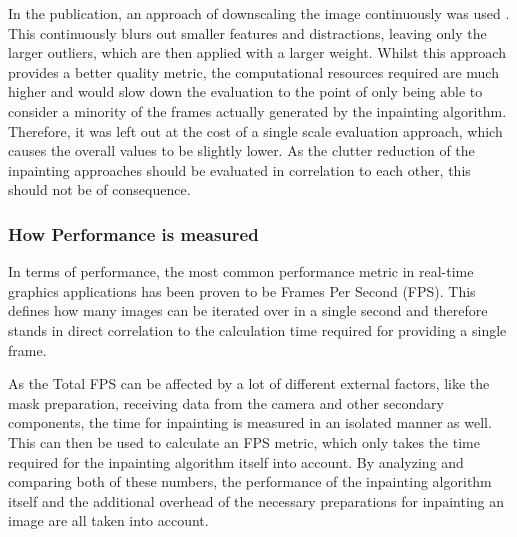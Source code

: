 In the publication, an approach of downscaling the image continuously was used \cite{RosenholtzRuth2007Mvc}.
This continuously blurs out smaller features and distractions, leaving only the larger outliers, which are then applied with a larger weight. Whilst this approach provides a better quality metric, the computational resources required are much higher and would slow down the evaluation to the point of only being able to consider a minority of the frames actually generated by the inpainting algorithm. 
Therefore, it was left out at the cost of a single scale evaluation approach, which causes the overall values to be slightly lower. As the clutter reduction of the inpainting approaches should be evaluated in correlation to each other, this should not be of consequence.

\subsubsection{How Performance is measured}

In terms of performance, the most common performance metric in real-time graphics applications has been proven to be Frames Per Second (FPS). This defines how many images can be iterated over in a single second and therefore stands in direct correlation to the calculation time required for providing a single frame.

As the Total FPS can be affected by a lot of different external factors, like the mask preparation, receiving data from the camera and other secondary components, the time for inpainting is measured in an isolated manner as well.
This can then be used to calculate an FPS metric, which only takes the time required for the inpainting algorithm itself into account.
By analyzing and comparing both of these numbers, the performance of the inpainting algorithm itself and the additional overhead of the necessary preparations for inpainting an image are all taken into account.